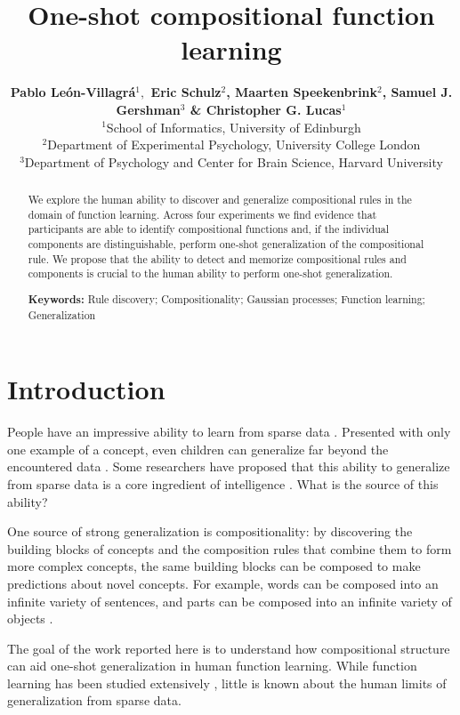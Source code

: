 \documentclass[10pt,letterpaper]{article}
\title{One-shot compositional function learning}
\author{\textbf{Pablo Le\'on-Villagr\'a$^1,$ Eric Schulz$^2$, Maarten Speekenbrink$^2$, Samuel J. Gershman$^3$ \& Christopher G. Lucas$^1$}\medskip\\ 
$^1$School of Informatics, University of Edinburgh\\
$^2$Department of Experimental Psychology, University College London\\
$^3$Department of Psychology and Center for Brain Science, Harvard University}
\begin{document}
\maketitle
\begin{abstract}
We explore the human ability to discover and generalize compositional rules in the domain of function learning. Across four experiments we find evidence that participants are able to identify compositional functions and, if the individual components are distinguishable, perform one-shot generalization of the compositional rule. We propose that the ability to detect and memorize compositional rules and components is crucial to the human ability to perform one-shot generalization.

\textbf{Keywords:} 
Rule discovery; Compositionality; Gaussian processes; Function learning; Generalization
\end{abstract}

\section{Introduction}

People have an impressive ability to learn from sparse data \cite{tenenbaum2011grow}. Presented with only one example of a concept, even children can generalize far beyond the encountered data \cite{perfors2009learning}. Some researchers have proposed that this ability to generalize from sparse data is a core ingredient of intelligence \cite{lake2016building}. What is the source of this ability?

One source of strong generalization is compositionality: by discovering the building blocks of concepts and the composition rules that combine them to form more complex concepts, the same building blocks can be composed to make predictions about novel concepts. For example, words can be composed into an infinite variety of sentences, and parts can be composed into an infinite variety of objects \cite{kemp2012exploring, dechter2013bootstrap,lake2015human}. 

The goal of the work reported here is to understand how compositional structure can aid one-shot generalization in human function learning. While function learning has been studied extensively \cite{mcdaniel2005conceptual}, little is known about the human limits of generalization from sparse data.%
\end{document}
